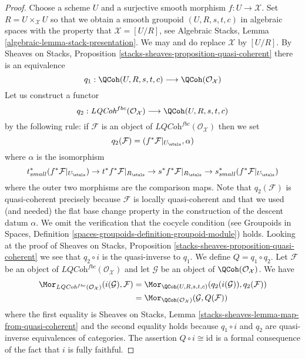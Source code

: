\begin{proof}
Choose a scheme $U$ and a surjective smooth morphism $f : U \to \mathcal{X}$.
Set $R = U \times_\mathcal{X} U$ so that we obtain a smooth groupoid
$(U, R, s, t, c)$ in algebraic spaces with the property that
$\mathcal{X} = [U/R]$, see
Algebraic Stacks, Lemma \ref{algebraic-lemma-stack-presentation}.
We may and do replace $\mathcal{X}$ by $[U/R]$. By
Sheaves on Stacks, Proposition \ref{stacks-sheaves-proposition-quasi-coherent}
there is an equivalence
$$
q_1 :
\QCoh(U, R, s, t, c)
\longrightarrow
\QCoh(\mathcal{O}_\mathcal{X})
$$
Let us construct a functor
$$
q_2 :
\textit{LQCoh}^{fbc}(\mathcal{O}_\mathcal{X})
\longrightarrow
\QCoh(U, R, s, t, c)
$$
by the following rule: if $\mathcal{F}$ is an object of
$\textit{LQCoh}^{fbc}(\mathcal{O}_\mathcal{X})$ then we set
$$
q_2(\mathcal{F}) = (f^*\mathcal{F}|_{U_\etale}, \alpha)
$$
where $\alpha$ is the isomorphism
$$
t_{small}^*(f^*\mathcal{F}|_{U_\etale})
\to
t^*f^*\mathcal{F}|_{R_\etale} \to
s^*f^*\mathcal{F}|_{R_\etale} \to
s_{small}^*(f^*\mathcal{F}|_{U_\etale})
$$
where the outer two morphisms are the comparison maps. Note that
$q_2(\mathcal{F})$ is quasi-coherent precisely because $\mathcal{F}$ is
locally quasi-coherent and that we used (and needed)
the flat base change property in the construction of
the descent datum $\alpha$. We omit the
verification that the cocycle condition (see
Groupoids in Spaces, Definition
\ref{spaces-groupoids-definition-groupoid-module})
holds. Looking at the proof of
Sheaves on Stacks, Proposition \ref{stacks-sheaves-proposition-quasi-coherent}
we see that $q_2 \circ i$ is the quasi-inverse to $q_1$.
We define $Q = q_1 \circ q_2$.
Let $\mathcal{F}$ be an object of
$\textit{LQCoh}^{fbc}(\mathcal{O}_\mathcal{X})$ and
let $\mathcal{G}$ be an object of $\QCoh(\mathcal{O}_\mathcal{X})$.
We have
\begin{align*}
\Mor_{\textit{LQCoh}^{fbc}(\mathcal{O}_\mathcal{X})}
(i(\mathcal{G}), \mathcal{F})
& =
\Mor_{\QCoh(U, R, s, t, c)}(q_2(i(\mathcal{G})), q_2(\mathcal{F})) \\
& =
\Mor_{\QCoh(\mathcal{O}_\mathcal{X})}(\mathcal{G}, Q(\mathcal{F}))
\end{align*}
where the first equality is
Sheaves on Stacks, Lemma \ref{stacks-sheaves-lemma-map-from-quasi-coherent}
and the second equality holds because $q_1 \circ i$ and $q_2$ are quasi-inverse
equivalences of categories. The assertion $Q \circ i \cong \text{id}$
is a formal consequence of the fact that $i$ is fully faithful.
\end{proof}

